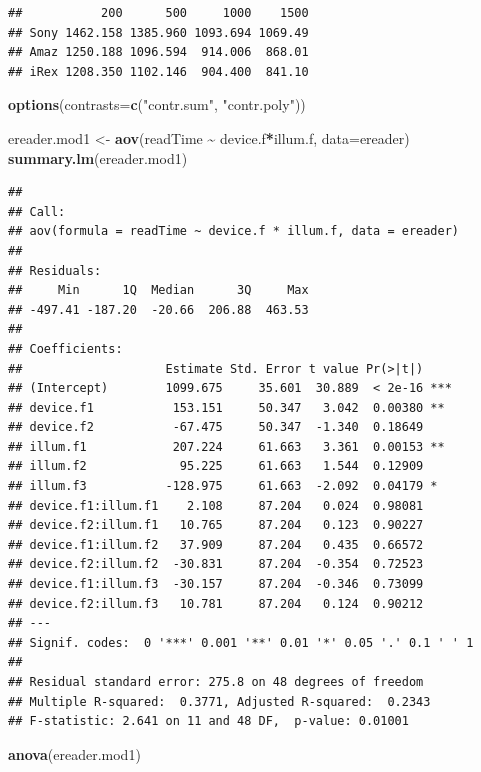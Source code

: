 \documentclass[
]{book}
\newenvironment{Shaded}{\begin{snugshade}}{\end{snugshade}}
\newcommand{\AttributeTok}[1]{\textcolor[rgb]{0.13,0.29,0.53}{#1}}
\newcommand{\FunctionTok}[1]{\textcolor[rgb]{0.13,0.29,0.53}{\textbf{#1}}}
\newcommand{\NormalTok}[1]{#1}
\newcommand{\OtherTok}[1]{\textcolor[rgb]{0.56,0.35,0.01}{#1}}
\newcommand{\SpecialCharTok}[1]{\textcolor[rgb]{0.81,0.36,0.00}{\textbf{#1}}}
\newcommand{\StringTok}[1]{\textcolor[rgb]{0.31,0.60,0.02}{#1}}
\begin{document}
\begin{verbatim}
##           200      500     1000    1500
## Sony 1462.158 1385.960 1093.694 1069.49
## Amaz 1250.188 1096.594  914.006  868.01
## iRex 1208.350 1102.146  904.400  841.10
\end{verbatim}

\begin{Shaded}
\begin{Highlighting}[]
\FunctionTok{options}\NormalTok{(}\AttributeTok{contrasts=}\FunctionTok{c}\NormalTok{(}\StringTok{"contr.sum"}\NormalTok{, }\StringTok{"contr.poly"}\NormalTok{))}

\NormalTok{ereader.mod1 }\OtherTok{\textless{}{-}} \FunctionTok{aov}\NormalTok{(readTime }\SpecialCharTok{\textasciitilde{}}\NormalTok{ device.f}\SpecialCharTok{*}\NormalTok{illum.f, }\AttributeTok{data=}\NormalTok{ereader)}
\FunctionTok{summary.lm}\NormalTok{(ereader.mod1)}
\end{Highlighting}
\end{Shaded}

\begin{verbatim}
## 
## Call:
## aov(formula = readTime ~ device.f * illum.f, data = ereader)
## 
## Residuals:
##     Min      1Q  Median      3Q     Max 
## -497.41 -187.20  -20.66  206.88  463.53 
## 
## Coefficients:
##                    Estimate Std. Error t value Pr(>|t|)    
## (Intercept)        1099.675     35.601  30.889  < 2e-16 ***
## device.f1           153.151     50.347   3.042  0.00380 ** 
## device.f2           -67.475     50.347  -1.340  0.18649    
## illum.f1            207.224     61.663   3.361  0.00153 ** 
## illum.f2             95.225     61.663   1.544  0.12909    
## illum.f3           -128.975     61.663  -2.092  0.04179 *  
## device.f1:illum.f1    2.108     87.204   0.024  0.98081    
## device.f2:illum.f1   10.765     87.204   0.123  0.90227    
## device.f1:illum.f2   37.909     87.204   0.435  0.66572    
## device.f2:illum.f2  -30.831     87.204  -0.354  0.72523    
## device.f1:illum.f3  -30.157     87.204  -0.346  0.73099    
## device.f2:illum.f3   10.781     87.204   0.124  0.90212    
## ---
## Signif. codes:  0 '***' 0.001 '**' 0.01 '*' 0.05 '.' 0.1 ' ' 1
## 
## Residual standard error: 275.8 on 48 degrees of freedom
## Multiple R-squared:  0.3771, Adjusted R-squared:  0.2343 
## F-statistic: 2.641 on 11 and 48 DF,  p-value: 0.01001
\end{verbatim}

\begin{Shaded}
\begin{Highlighting}[]
\FunctionTok{anova}\NormalTok{(ereader.mod1)}
\end{Highlighting}
\end{Shaded}
\end{document}
